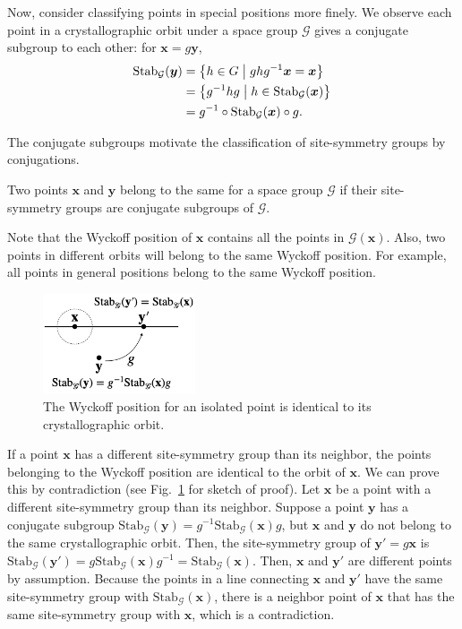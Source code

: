 Now, consider classifying points in special positions more finely.
We observe each point in a crystallographic orbit under a space group $\mathcal{G}$ gives a conjugate subgroup to each other: for $\bm{x} = g \bm{y}$,
\begin{align}
  \mathrm{Stab}_{\mathcal{G}}(\bm{y})
    &= \left\{  h \in G  \mathrel{}\middle|\mathrel{}  ghg^{-1}\bm{x} = \bm{x}  \right\} \nonumber \\
    &= \left\{  g^{-1} h g  \mathrel{}\middle|\mathrel{}  h \in \mathrm{Stab}_{\mathcal{G}}(\bm{x})  \right\} \nonumber \\
    &= g^{-1} \circ \mathrm{Stab}_{\mathcal{G}}(\bm{x}) \circ g.
\end{align}

The conjugate subgroups motivate the classification of site-symmetry groups by conjugations.
\begin{screen}
  \begin{defn}
    Two points $\bm{x}$ and $\bm{y}$ belong to the same  for a space group $\mathcal{G}$ if their site-symmetry groups are conjugate subgroups of $\mathcal{G}$.
  \end{defn}
\end{screen}

Note that the Wyckoff position of $\bm{x}$ contains all the points in $\mathcal{G}(\bm{x})$.
Also, two points in different orbits will belong to the same Wyckoff position.
For example, all points in general positions belong to the same Wyckoff position.

\begin{figure}[htb]
  \centering
  \includegraphics[width=0.4\textwidth]{figure/fig_wyckoff.png}
  \caption{The Wyckoff position for an isolated point is identical to its crystallographic orbit.}
  \label{fig:isolated-wyckoff-position}
\end{figure}

If a point $\bm{x}$ has a different site-symmetry group than its neighbor, the points belonging to the Wyckoff position are identical to the orbit of $\bm{x}$.
We can prove this by contradiction (see Fig.~\ref{fig:isolated-wyckoff-position} for sketch of proof).
Let $\bm{x}$ be a point with a different site-symmetry group than its neighbor.
Suppose a point $\bm{y}$ has a conjugate subgroup $\mathrm{Stab}_{\mathcal{G}}(\bm{y}) = g^{-1}  \mathrm{Stab}_{\mathcal{G}}(\bm{x}) g$, but $\bm{x}$ and $\bm{y}$ do not belong to the same crystallographic orbit.
Then, the site-symmetry group of $\bm{y}' = g\bm{x}$ is $\mathrm{Stab}_{\mathcal{G}}(\bm{y}') = g \mathrm{Stab}_{\mathcal{G}}(\bm{x}) g^{-1} = \mathrm{Stab}_{\mathcal{G}}(\bm{x})$.
Then, $\bm{x}$ and $\bm{y}'$ are different points by assumption.
Because the points in a line connecting $\bm{x}$ and $\bm{y}'$ have the same site-symmetry group with $\mathrm{Stab}_{\mathcal{G}}(\bm{x})$, there is a neighbor point of $\bm{x}$ that has the same site-symmetry group with $\bm{x}$, which is a contradiction.

